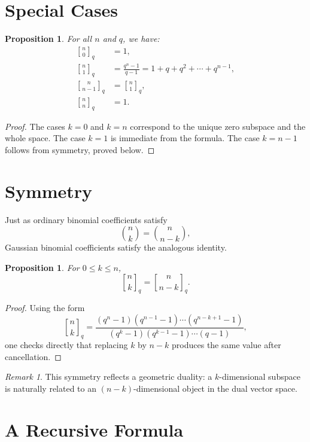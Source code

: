 \documentclass[11pt]{article}
\newtheorem{proposition}[theorem]{Proposition}
\theoremstyle{definition}
\theoremstyle{remark}
\newtheorem{remark}[theorem]{Remark}
\newcommand{\qbinom}[2]{\genfrac{[}{]}{0pt}{}{#1}{#2}_q}
\begin{document}
	\section{Special Cases}
	
	\begin{proposition}
		For all \(n\) and \(q\), we have:
		\begin{align*}
			\qbinom{n}{0} &= 1,\\
			\qbinom{n}{1} &= \frac{q^n-1}{q-1}=1+q+q^2+\cdots+q^{n-1},\\
			\qbinom{n}{n-1} &= \qbinom{n}{1},\\
			\qbinom{n}{n} &= 1.
		\end{align*}
	\end{proposition}
	
	\begin{proof}
		The cases \(k=0\) and \(k=n\) correspond to the unique zero subspace and the whole space. The case \(k=1\) is immediate from the formula. The case \(k=n-1\) follows from symmetry, proved below.
	\end{proof}
	
	\section{Symmetry}
	
	Just as ordinary binomial coefficients satisfy
	\[
	\binom{n}{k}=\binom{n}{n-k},
	\]
	Gaussian binomial coefficients satisfy the analogous identity.
	
	\begin{proposition}
		For \(0\leq k\leq n\),
		\[
		\qbinom{n}{k}=\qbinom{n}{n-k}.
		\]
	\end{proposition}
	
	\begin{proof}
		Using the form
		\[
		\qbinom{n}{k}
		=
		\frac{(q^n-1)(q^{n-1}-1)\cdots(q^{n-k+1}-1)}
		{(q^k-1)(q^{k-1}-1)\cdots(q-1)},
		\]
		one checks directly that replacing \(k\) by \(n-k\) produces the same value after cancellation.
	\end{proof}
	
	\begin{remark}
		This symmetry reflects a geometric duality: a \(k\)-dimensional subspace is naturally related to an \((n-k)\)-dimensional object in the dual vector space.
	\end{remark}
	
	\section{A Recursive Formula}
	
\end{document}
